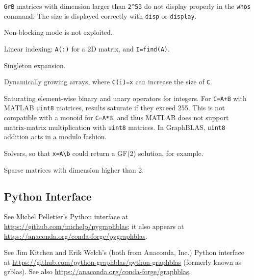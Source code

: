 \documentclass[12pt]{article}
\newenvironment{packed_itemize}{
\begin{itemize}
  \setlength{\itemsep}{1pt}
  \setlength{\parskip}{0pt}
  \setlength{\parsep}{0pt}
}{\end{itemize}}
\begin{document}
\begin{packed_itemize}
    \item \verb'GrB' matrices with dimension larger than \verb'2^53' do not
        display properly in the \verb'whos' command.  The size is displayed
        correctly with \verb'disp' or \verb'display'.
    \item Non-blocking mode is not exploited.
    \item Linear indexing: \verb'A(:)' for a 2D matrix, and \verb'I=find(A)'.
    \item Singleton expansion.
    \item Dynamically growing arrays, where \verb'C(i)=x' can increase
        the size of \verb'C'.
    \item Saturating element-wise binary and unary operators for integers.
        For \verb'C=A+B' with MATLAB \verb'uint8' matrices, results
        saturate if they exceed 255.  This is not compatible with
        a monoid for \verb'C=A*B', and thus MATLAB does not support
        matrix-matrix multiplication with \verb'uint8' matrices.
        In GraphBLAS, \verb'uint8' addition acts in a modulo fashion.
    \item Solvers, so that \verb'x=A\b' could return a GF(2) solution,
        for example.
    \item Sparse matrices with dimension higher than 2.
\end{packed_itemize}

\subsection{Python Interface}
\label{python}

See Michel Pelletier's Python interface at
\url{https://github.com/michelp/pygraphblas};
it also appears at
\url{https://anaconda.org/conda-forge/pygraphblas}.

See Jim Kitchen and Erik Welch's (both from Anaconda, Inc.) Python interface at
\url{https://github.com/python-graphblas/python-graphblas} (formerly known as grblas).
See also \url{https://anaconda.org/conda-forge/graphblas}.
\end{document}
